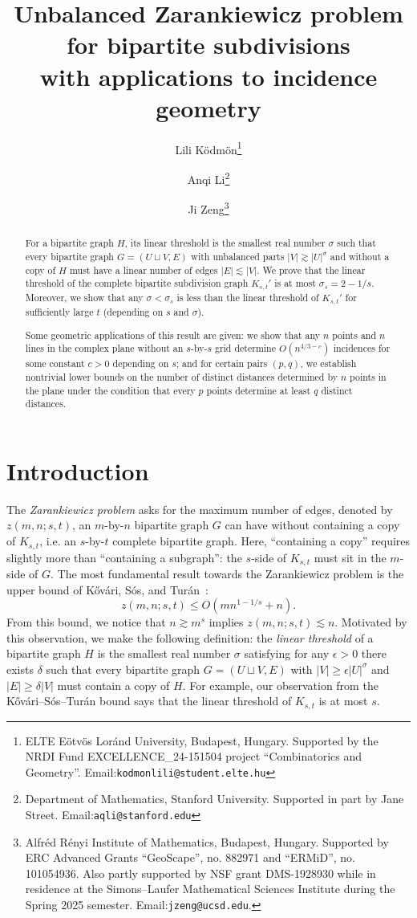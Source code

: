 \documentclass[11pt]{article}
\date{}
\title{Unbalanced Zarankiewicz problem for bipartite subdivisions \\ with applications to incidence geometry}
\author{
Lili Ködmön\thanks{ELTE Eötvös Loránd University, Budapest, Hungary. Supported by the NRDI Fund EXCELLENCE\_24-151504 project ``Combinatorics and Geometry''. Email:{\tt kodmonlili@student.elte.hu}}
\and
Anqi Li\thanks{Department of Mathematics, Stanford University. Supported in part by Jane Street. Email:{\tt aqli@stanford.edu}}
\and
Ji Zeng\thanks{Alfréd Rényi Institute of Mathematics, Budapest, Hungary. Supported by ERC Advanced Grants ``GeoScape'', no. 882971 and ``ERMiD'', no. 101054936. Also partly supported by NSF grant DMS-1928930 while in residence at the Simons--Laufer Mathematical Sciences Institute during the Spring 2025 semester. Email:{\tt jzeng@ucsd.edu}.}
}
\theoremstyle{definition}
\begin{document}
\maketitle

\begin{abstract}
For a bipartite graph $H$, its linear threshold is the smallest real number $\sigma$ such that every bipartite graph $G = (U \sqcup V, E)$ with unbalanced parts $|V| \gtrsim |U|^\sigma$ and without a copy of $H$ must have a linear number of edges $|E| \lesssim |V|$. We prove that the linear threshold of the complete bipartite subdivision graph $K_{s,t}'$ is at most $\sigma_s = 2 - 1/s$. Moreover, we show that any $\sigma < \sigma_s$ is less than the linear threshold of $K_{s,t}'$ for sufficiently large $t$ (depending on $s$ and $\sigma$).

Some geometric applications of this result are given: we show that any $n$ points and $n$ lines in the complex plane without an $s$-by-$s$ grid determine $O(n^{4/3 - c})$ incidences for some constant $c > 0$ depending on $s$; and for certain pairs $(p,q)$, we establish nontrivial lower bounds on the number of distinct distances determined by $n$ points in the plane under the condition that every $p$ points determine at least $q$ distinct distances.
\end{abstract}

\section{Introduction}

The \textit{Zarankiewicz problem} asks for the maximum number of edges, denoted by $z(m,n;s,t)$, an $m$-by-$n$ bipartite graph $G$ can have without containing a copy of $K_{s,t}$, i.e. an $s$-by-$t$ complete bipartite graph. Here, ``containing a copy'' requires slightly more than ``containing a subgraph'': the $s$-side of $K_{s,t}$ must sit in the $m$-side of $G$. The most fundamental result towards the Zarankiewicz problem is the upper bound of K\H{o}v\'ari, S\'os, and Tur\'an~\cite{kHovari1954problem}:\begin{equation*}
    z(m,n;s,t) \leq O(mn^{1-1/s} + n).
\end{equation*} From this bound, we notice that $n \gtrsim m^{s}$ implies $z(m,n;s,t) \lesssim n$. Motivated by this observation, we make the following definition: the \textit{linear threshold} of a bipartite graph $H$ is the smallest real number $\sigma$ satisfying for any $\epsilon>0$ there exists $\delta$ such that every bipartite graph $G = (U \sqcup V, E)$ with $|V| \geq \epsilon|U|^\sigma$ and $|E| \geq \delta|V|$ must contain a copy of $H$. For example, our observation from the K\H{o}v\'ari--S\'os--Tur\'an bound says that the linear threshold of $K_{s,t}$ is at most $s$.
\end{document}
